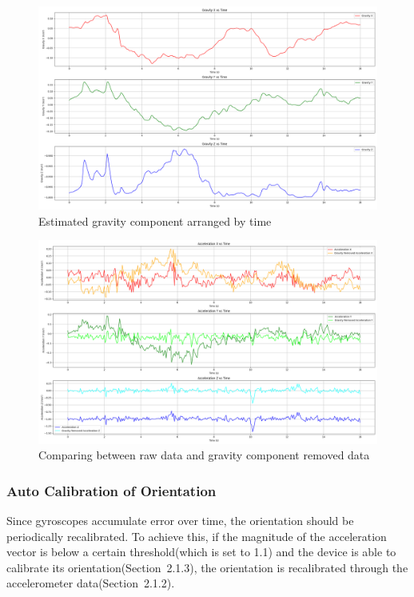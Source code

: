 \documentclass{article}
\begin{document}
    \FloatBarrier
    \begin{figure}[ht]
        \centering
        \includegraphics[width=\textwidth]{2_1_5_1.png}
        \caption{Estimated gravity component arranged by time}
        \label{fig:gravity_component}
    \end{figure}
    \FloatBarrier
    \begin{figure}[ht]
        \centering
        \includegraphics[width=\textwidth]{2_1_5_2.png}
        \caption{Comparing between raw data and gravity component removed data}
        \label{fig:removal_of_gravity_component}
    \end{figure}

    \FloatBarrier
    \subsubsection{Auto Calibration of Orientation}
    Since gyroscopes accumulate error over time, the orientation should be periodically
    recalibrated. To achieve this, if the magnitude of the acceleration vector is
    below a certain threshold(which is set to 1.1) and the device is able to
    calibrate its orientation(Section~2.1.3), the orientation is recalibrated through
    the accelerometer data(Section~2.1.2).
\end{document}
